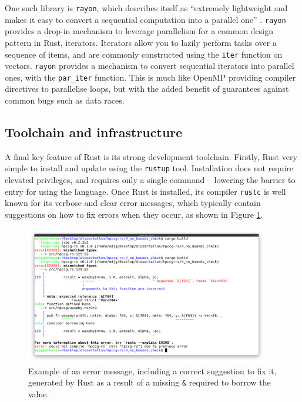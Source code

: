 One such library is \texttt{rayon}, which describes itself as ``extremely lightweight and makes it easy to convert a sequential computation into a parallel one'' \cite{RayonRust}. \texttt{rayon} provides a drop-in mechanism to leverage parallelism for a common design pattern in Rust, iterators. Iterators allow you to lazily perform tasks over a sequence of items, and are commonly constructed using the \texttt{iter} function on vectors. \texttt{rayon} provides a mechanism to convert sequential iterators into parallel ones, with the \texttt{par\_iter} function. This is much like OpenMP providing compiler directives to parallelise loops, but with the added benefit of guarantees against common bugs such as data races.

\subsection{Toolchain and infrastructure}
\label{ssec:rust-toolchain}

A final key feature of Rust is its strong development toolchain. Firstly, Rust very simple to install and update using the \texttt{rustup} tool. Installation does not require elevated privileges, and requires only a single command -- lowering the barrier to entry for using the language. Once Rust is installed, its compiler \texttt{rustc} is well known for its verbose and clear error messages, which typically contain suggestions on how to fix errors when they occur, as shown in Figure \ref{fig:rust_error_messages}.

\begin{figure}[H]
    \centering
    \includegraphics[width=0.95\textwidth]{images/2_background/rust_error_messages.png}
    \caption{Example of an error message, including a correct suggestion to fix it, generated by Rust as a result of a missing \texttt{&} required to borrow the value.}
    \label{fig:rust_error_messages}
\end{figure}

